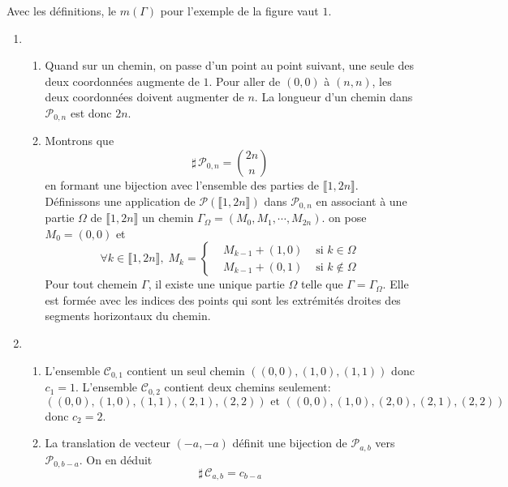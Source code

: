Avec les définitions, le $m(\Gamma)$ pour l'exemple de la figure vaut $1$.
\begin{enumerate}
 \item 
\begin{enumerate}
 \item Quand sur un chemin, on passe d'un point au point suivant, une seule des deux coordonnées augmente de $1$. Pour aller de $(0,0)$ à $(n,n)$, les deux coordonnées doivent augmenter de $n$. La longueur d'un chemin dans $\mathcal{P}_{0,n}$ est donc $2n$. 
 \item Montrons que 
\begin{displaymath}
\sharp\,\mathcal{P}_{0,n} = \binom{2n}{n} 
\end{displaymath}
en formant une bijection avec l'ensemble des parties de $\llbracket 1,2n \rrbracket$.\newline
Définissons une application de $\mathcal{P}(\llbracket 1,2n \rrbracket)$ dans $\mathcal{P}_{0,n} $ en associant à une partie $\Omega$ de $\llbracket 1,2n \rrbracket$ un chemin $\Gamma_\Omega=(M_0,M_1,\cdots,M_{2n})$. on pose $M_0=(0,0)$ et
\begin{displaymath}
\forall k\in \llbracket 1,2n \rrbracket,\;
M_k=
\left\lbrace  
\begin{aligned}
 &M_{k-1}+(1,0) &\text{ si } k\in \Omega \\
 &M_{k-1}+(0,1) &\text{ si } k\notin \Omega 
\end{aligned}
\right. 
\end{displaymath}
Pour tout chemein $\Gamma$, il existe une unique partie $\Omega$ telle que $\Gamma=\Gamma_\Omega$. Elle est formée avec les indices des points qui sont les extrémités droites des segments horizontaux du chemin.
\end{enumerate}

 \item 
\begin{enumerate}
 \item L'ensemble $\mathcal{C}_{0,1}$ contient un seul chemin $((0,0),(1,0),(1,1))$ donc $c_1=1$.\newline
L'ensemble $\mathcal{C}_{0,2}$ contient deux chemins seulement:
\begin{displaymath}
 ((0,0),(1,0),(1,1),(2,1),(2,2))\text{ et } ((0,0),(1,0),(2,0),(2,1),(2,2))
\end{displaymath}
donc $c_2=2$.
 \item La translation de vecteur $(-a,-a)$ définit une bijection de $\mathcal{P}_{a,b}$ vers $\mathcal{P}_{0,b-a}$. On en déduit
\begin{displaymath}
 \sharp\,\mathcal{C}_{a,b} = c_{b-a}
\end{displaymath}


\end{enumerate}
\end{enumerate}
